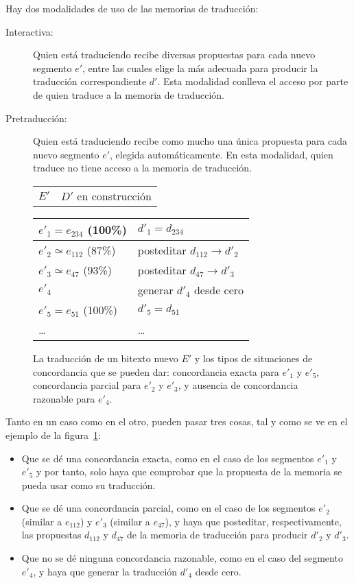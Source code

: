 Hay dos modalidades de uso de las memorias de traducción: \begin{description} \item[Interactiva:] Quien está traduciendo recibe diversas propuestas para cada nuevo segmento $e'$, entre las cuales elige la más adecuada para producir la traducción correspondiente $d'$. Esta modalidad conlleva el acceso por parte de quien traduce a la memoria de traducción. \item[Pretraducción:] Quien está traduciendo recibe como mucho una única propuesta para cada nuevo segmento $e'$, elegida automáticamente. En esta modalidad, quien traduce no tiene acceso a la memoria de traducción. \end{description} \begin{figure} \begin{center} \begin{tabular}{p{3cm}p{4cm}} $E'$ &$D'$ en construcción \end{tabular} \begin{tabular}{|p{3cm}|p{4cm}|} \hline

$e'_1=e_{234}$ (100\%)& $d'_1=d_{234}$ \\\hline $e'_2\simeq e_{112}$ (87\%) &posteditar $d_{112} \to d'_2$ \\\hline $e'_3\simeq e_{47}$ (93\%) &posteditar $d_{47} \to d'_3$ \\\hline $e'_4$ &generar $d'_4$ desde cero \\\hline $e'_5=e_{51}$ (100\%) &$d'_5=d_{51}$ \\\hline \ldots &\ldots \\\hline \end{tabular} \end{center} \caption{La traducción de un bitexto nuevo $E'$ y los tipos de situaciones de concordancia que se pueden dar: concordancia exacta para $e'_1$ y $e'_5$, concordancia parcial para $e'_2$ y $e'_3$, y ausencia de concordancia razonable para $e'_4$.} \label{fg:pretrad} \end{figure} Tanto en un caso como en el otro, pueden pasar tres cosas, tal y como se ve en el ejemplo de la figura~\ref{fg:pretrad}: \begin{itemize} \item Que se dé una concordancia exacta, como en el caso de los segmentos $e'_1$ y $e'_5$ y por tanto, solo haya que comprobar que la propuesta de la memoria se pueda usar como su traducción. \item Que se dé una concordancia parcial, como en el caso de los segmentos $e'_2$ (similar a $e_{112}$) y $e'_3$ (similar a $e_{47}$), y haya que posteditar, respectivamente, las propuestas $d_{112}$ y $d_{47}$ de la memoria de traducción para producir $d'_2$ y $d'_3$. \item Que no se dé ninguna concordancia razonable, como en el caso del segmento $e'_4$, y haya que generar la traducción $d'_4$ desde cero. \end{itemize} 

